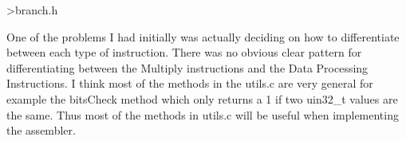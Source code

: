 \documentclass[11pt]{article}
\begin{document}
>branch.h

One of the problems I had initially was actually deciding on how to differentiate between each type of instruction. There
was no obvious clear pattern for differentiating between the Multiply instructions and the Data Processing Instructions.
I think most of the methods in the utils.c are very general for example the bitsCheck method which only returns a 1 if two
uin32_t values are the same. Thus most of the methods in utils.c will be useful when implementing the assembler.
\end{document}
